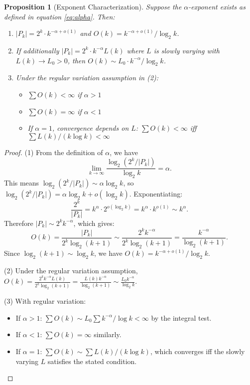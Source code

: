 \documentclass[11pt]{article}
\newtheorem{proposition}[theorem]{Proposition}
\theoremstyle{definition}
\begin{document}
\begin{proposition}[Exponent Characterization]\label{prop:alpha-char}
Suppose the $\alpha$-exponent exists as defined in equation \eqref{eq:alpha}. Then:
\begin{enumerate}
\item $|P_k| = 2^k \cdot k^{-\alpha+o(1)}$ and $O(k) = k^{-\alpha+o(1)}/\log_2 k$.
\item If additionally $|P_k| = 2^k \cdot k^{-\alpha} L(k)$ where $L$ is slowly varying with $L(k) \to L_0 > 0$, then $O(k) \sim L_0 \cdot k^{-\alpha}/\log_2 k$.
\item Under the regular variation assumption in (2):
  \begin{itemize}
  \item $\sum O(k) < \infty$ if $\alpha > 1$
  \item $\sum O(k) = \infty$ if $\alpha < 1$
  \item If $\alpha = 1$, convergence depends on $L$: $\sum O(k) < \infty$ iff $\sum L(k)/(k\log k) < \infty$
  \end{itemize}
\end{enumerate}
\end{proposition}

\begin{proof}
(1) From the definition of $\alpha$, we have
$$\lim_{k \to \infty} \frac{\log_2(2^k/|P_k|)}{\log_2 k} = \alpha.$$
This means $\log_2(2^k/|P_k|) \sim \alpha \log_2 k$, so $\log_2(2^k/|P_k|) = \alpha \log_2 k + o(\log_2 k)$. Exponentiating:
$$\frac{2^k}{|P_k|} = k^\alpha \cdot 2^{o(\log_2 k)} = k^\alpha \cdot k^{o(1)} \sim k^\alpha.$$
Therefore $|P_k| \sim 2^k k^{-\alpha}$, which gives:
$$O(k) = \frac{|P_k|}{2^k \log_2(k+1)} \sim \frac{2^k k^{-\alpha}}{2^k \log_2(k+1)} = \frac{k^{-\alpha}}{\log_2(k+1)}.$$
Since $\log_2(k+1) \sim \log_2 k$, we have $O(k) = k^{-\alpha+o(1)}/\log_2 k$.

(2) Under the regular variation assumption, $O(k) = \frac{2^k k^{-\alpha} L(k)}{2^k \log_2(k+1)} = \frac{L(k) k^{-\alpha}}{\log_2(k+1)} \sim \frac{L_0 k^{-\alpha}}{\log_2 k}$.

(3) With regular variation:
\begin{itemize}
\item If $\alpha > 1$: $\sum O(k) \sim L_0 \sum k^{-\alpha}/\log k < \infty$ by the integral test.
\item If $\alpha < 1$: $\sum O(k) = \infty$ similarly.
\item If $\alpha = 1$: $\sum O(k) \sim \sum L(k)/(k\log k)$, which converges iff the slowly varying $L$ satisfies the stated condition.
\end{itemize}
\end{proof}
\end{document}
